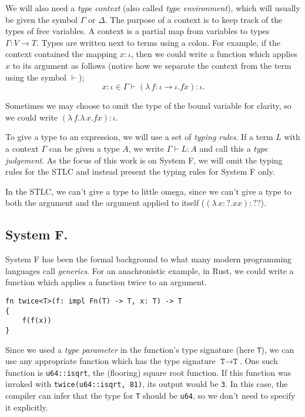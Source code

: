 We will also need a \textit{type context} (also called \textit{type environment}), which will
usually be given the symbol $\Gamma$ or $\Delta$. The purpose of a context is to keep track of
the types of free variables. A context is a partial map from variables to types $\Gamma \colon
V \to T$. Types are written next to terms using a colon. For example, if the context contained the
mapping $x \colon \iota$, then we could write a function which applies $x$ to its argument as follows
(notice how we separate the context from the term using the symbol $\vdash$);
\begin{equation*}
  x \colon \iota \in \Gamma \vdash (\lambda \, f \colon \iota \to \iota . f x) \colon \iota.
\end{equation*}

Sometimes we may choose to omit the type of the bound variable for clarity, so we could write
$(\lambda \, f. \lambda \, x. fx) \colon \iota$.

To give a type to an expression, we will use a set of \textit{typing rules}. If a term $L$ with a
context $\Gamma$ can be given a type $A$, we write $\Gamma \vdash L \colon A$ and call this a
\textit{type judgement}. As the focus of this work is on System F, we will omit the typing rules for
the STLC and instead present the typing rules for System F only.

In the STLC, we can't give a type to little omega, since we can't give a type to both the argument
and the argument applied to itself ($(\lambda \, x  \colon ? . x x) \colon ??$).

\subsection{System F.}
System F has been the formal background to what many modern programming
languages call \textit{generics}. For an anachronistic example, in Rust, we could write a function
which applies a function twice to an argument.

\begin{verbatim}
fn twice<T>(f: impl Fn(T) -> T, x: T) -> T
{
    f(f(x))
}
\end{verbatim}

Since we used a \textit{type parameter} in the function's type signature (here \texttt{T}), we can
use any appropriate function which has the type signature $\texttt{T} \to \texttt{T}$. One such
function is \texttt{u64::isqrt}, the (flooring) square root function. If this function was invoked
with \texttt{twice(u64::isqrt, 81)}, its output would be \texttt{3}. In this case, the compiler can
infer that the type for \texttt{T} should be \texttt{u64}, so we don't need to specify it
explicitly.

